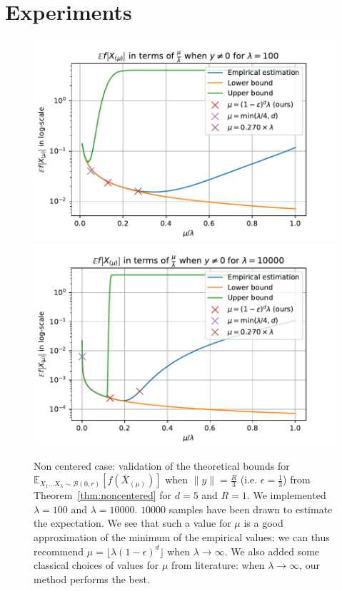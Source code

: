 
\section{Experiments}
\begin{figure}[t]
    \centering
    \includegraphics[width=.45\textwidth]{sections/appendix/ppsn2020-kbest/imgs/n=100.pdf}
    \includegraphics[width=.45\textwidth]{sections/appendix/ppsn2020-kbest/imgs/n=10000.pdf}
    \caption{Non centered  case: validation of the theoretical bounds for $\mathbb{E}_{X_1...X_\lambda\sim\mathcal{B}(0,r)}\left[ f(\bar X_{(\mu)})\right]$ when $\rVert y\rVert =\frac{R}{3}$ (i.e. $\epsilon=\frac{1}{3}$) from Theorem~\ref{thm:noncentered} for $d=5$ and $R=1$. We implemented $\lambda=100$ and $\lambda=10000$. $10000$  samples have been drawn to estimate the expectation. We see that such a value for $\mu$ is a good approximation of the minimum of the empirical values{: we can thus recommend $\mu=\lfloor \lambda (1-\epsilon)^d\rfloor$ when $\lambda\rightarrow\infty$.} We also added some classical choices of values for $\mu$ from literature: when $\lambda\rightarrow\infty$, our method performs the best.}
    \label{fig:exp_th_nc}
\end{figure}


